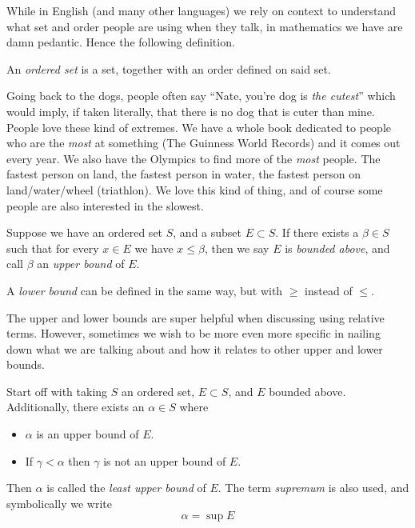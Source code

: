 \documentclass[../../templates/section]{subfiles}
\begin{document}
While in English (and many other languages) we rely on context to understand
what set and order people are using when they talk, in mathematics we have are
damn pedantic. Hence the following definition.

\begin{definition}\label{def:ordered-set}
    An \emph{ordered set} is a set, together with an order defined on said set.
\end{definition}

Going back to the dogs, people often say ``Nate, you're dog is \emph{the
cutest}'' which would imply, if taken literally, that there is no dog that is
cuter than mine. People love these kind of extremes. We have a whole book
dedicated to people who are the \emph{most} at something (The Guinness World
Records) and it comes out every year. We also have the Olympics to find more of
the \emph{most} people. The fastest person on land, the fastest person in
water, the fastest person on land/water/wheel (triathlon). We love this kind of
thing, and of course some people are also interested in the slowest.

\begin{definition}\label{def:upper-bound}
    Suppose we have an ordered set $S$, and a subset $E\subset S$. If there
    exists a $\beta\in S$ such that for every $x\in E$ we have $x\leq\beta$,
    then we say $E$ is \emph{bounded above}, and call $\beta$ an \emph{upper
    bound} of $E$.
\end{definition}

A \emph{lower bound} can be defined in the same way, but with $\geq$ instead of
$\leq$.

The upper and lower bounds are super helpful when discussing using relative
terms. However, sometimes we wish to be more even more specific in nailing down
what we are talking about and how it relates to other upper and lower bounds.

\begin{definition}\label{def:least-upper-bound}
    Start off with taking $S$ an ordered set, $E\subset S$, and $E$ bounded
    above. Additionally, there exists an $\alpha\in S$ where
    \begin{itemize}
        \item $\alpha$ is an upper bound of $E$.
        \item If $\gamma < \alpha$ then $\gamma$ is not an upper bound of $E$.
    \end{itemize}
    Then $\alpha$ is called the \emph{least upper bound} of $E$. The term
    \emph{supremum} is also used, and symbolically we write
    \[\alpha = \sup{E}\]
\end{definition}
\end{document}
